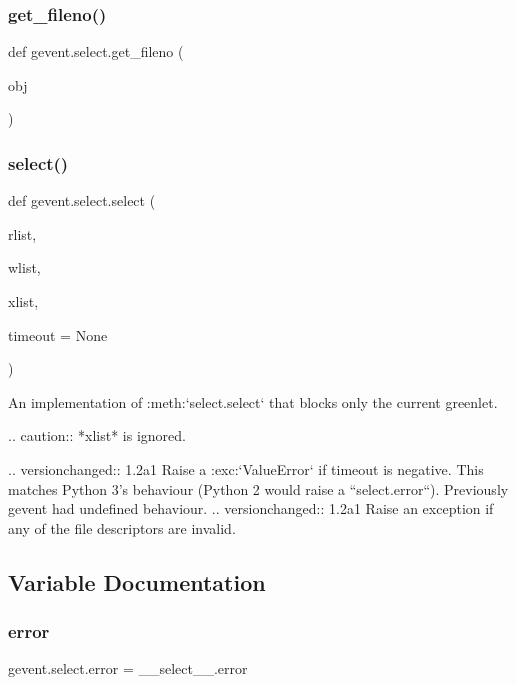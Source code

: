\subsubsection{\texorpdfstring{get\+\_\+fileno()}{get\_fileno()}}
{\footnotesize\ttfamily def gevent.\+select.\+get\+\_\+fileno (\begin{DoxyParamCaption}\item[{}]{obj }\end{DoxyParamCaption})}

\mbox{\label{namespacegevent_1_1select_aa001b4b6ecde28467c1e0c9329d8418d}} 
\subsubsection{\texorpdfstring{select()}{select()}}
{\footnotesize\ttfamily def gevent.\+select.\+select (\begin{DoxyParamCaption}\item[{}]{rlist,  }\item[{}]{wlist,  }\item[{}]{xlist,  }\item[{}]{timeout = {\ttfamily None} }\end{DoxyParamCaption})}

\begin{DoxyVerb}An implementation of :meth:`select.select` that blocks only the current greenlet.

.. caution:: *xlist* is ignored.

.. versionchanged:: 1.2a1
   Raise a :exc:`ValueError` if timeout is negative. This matches Python 3's
   behaviour (Python 2 would raise a ``select.error``). Previously gevent had
   undefined behaviour.
.. versionchanged:: 1.2a1
   Raise an exception if any of the file descriptors are invalid.
\end{DoxyVerb}
 

\subsection{Variable Documentation}
\mbox{\label{namespacegevent_1_1select_a08385e621115d5284edb3890ea2a82af}} 
\subsubsection{\texorpdfstring{error}{error}}
{\footnotesize\ttfamily gevent.\+select.\+error = \+\_\+\+\_\+select\+\_\+\+\_\+.\+error}


